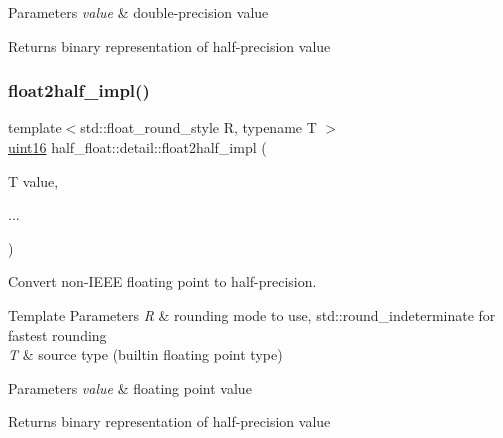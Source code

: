 \begin{DoxyParams}{Parameters}
{\em value} & double-\/precision value \\
\hline
\end{DoxyParams}
\begin{DoxyReturn}{Returns}
binary representation of half-\/precision value 
\end{DoxyReturn}
\mbox{\label{namespacehalf__float_1_1detail_a7a40ca55db89afccd351332db5535ed1}} 
\subsubsection{\texorpdfstring{float2half\+\_\+impl()}{float2half\_impl()}\hspace{0.1cm}{\footnotesize\ttfamily [3/3]}}
{\footnotesize\ttfamily template$<$std\+::float\+\_\+round\+\_\+style R, typename T $>$ \\
\hyperlink{namespacehalf__float_1_1detail_a239ec58092b4e4849b444baee1a01088}{uint16} half\+\_\+float\+::detail\+::float2half\+\_\+impl (\begin{DoxyParamCaption}\item[{T}]{value,  }\item[{}]{... }\end{DoxyParamCaption})}

Convert non-\/\+I\+E\+EE floating point to half-\/precision. 
\begin{DoxyTemplParams}{Template Parameters}
{\em R} & rounding mode to use, {\ttfamily std\+::round\+\_\+indeterminate} for fastest rounding \\
\hline
{\em T} & source type (builtin floating point type) \\
\hline
\end{DoxyTemplParams}

\begin{DoxyParams}{Parameters}
{\em value} & floating point value \\
\hline
\end{DoxyParams}
\begin{DoxyReturn}{Returns}
binary representation of half-\/precision value 
\end{DoxyReturn}
\mbox{\label{namespacehalf__float_1_1detail_ad34d698311b83780c4df38d8a8274756}} 

